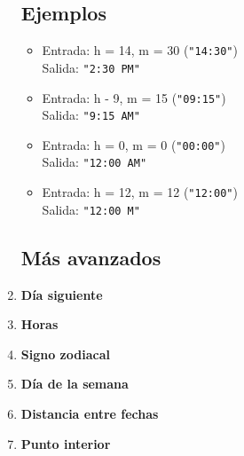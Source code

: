 \begin{enumerate}
    \subsection*{Ejemplos}
    \begin{itemize}
        \item Entrada: h = 14, m = 30 (\texttt{"14:30"})\\
              Salida: \texttt{"2:30 PM"}
        \item Entrada: h - 9, m = 15 (\texttt{"09:15"})\\
              Salida: \texttt{"9:15 AM"}
        \item Entrada: h = 0, m = 0 (\texttt{"00:00"})\\
              Salida: \texttt{"12:00 AM"}
        \item Entrada: h = 12, m = 12 (\texttt{"12:00"})\\
              Salida: \texttt{"12:00 M"}
    \end{itemize}

\subsection*{Más avanzados}


    \item \textbf{Día siguiente}\\
    

    \item \textbf{Horas}
    

    \item \textbf{Signo zodiacal}\\
    

    \item \textbf{Día de la semana}\\
    

    \item \textbf{Distancia entre fechas}\\
    

    \item \textbf{Punto interior}\\
    
\end{enumerate}

